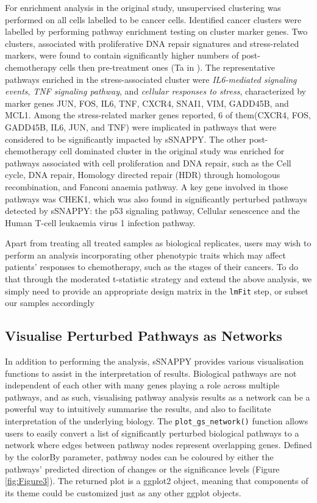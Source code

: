 \documentclass[9pt,a4paper,]{extarticle}
\begin{document}
For enrichment analysis in the original study\citep{Zhang2022}, unsupervised clustering was performed on all cells labelled to be cancer cells.
Identified cancer clusters were labelled by performing pathway enrichment testing on cluster marker genes.
Two clusters, associated with proliferative DNA repair signatures and stress-related markers, were found to contain significantly higher numbers of post-chemotherapy cells then pre-treatment ones (Ta in \citep{Zhang2022}).
The representative pathways enriched in the stress-associated cluster were \emph{IL6-mediated signaling events}, \emph{TNF signaling pathway}, and \emph{cellular responses to stress}, characterized by marker genes JUN, FOS, IL6, TNF, CXCR4, SNAI1, VIM, GADD45B, and MCL1.
Among the stress-related marker genes reported, 6 of them(CXCR4, FOS, GADD45B, IL6, JUN, and TNF) were implicated in pathways that were considered to be significantly impacted by sSNAPPY.
The other post-chemotherapy cell dominated cluster in the original study was enriched for pathways associated with cell proliferation and DNA repair, such as the Cell cycle, DNA repair, Homology directed repair (HDR) through homologous recombination, and Fanconi anaemia pathway.
A key gene involved in those pathways was CHEK1, which was also found in significantly perturbed pathways detected by sSNAPPY: the p53 signaling pathway, Cellular senescence and the Human T-cell leukaemia virus 1 infection pathway.

Apart from treating all treated samples as biological replicates, users may wish to perform an analysis incorporating other phenotypic traits which may affect patients' responses to chemotherapy, such as the stages of their cancers.
To do that through the moderated t-statistic strategy and extend the above analysis, we simply need to provide an appropriate design matrix in the \texttt{lmFit} step, or subset our samples accordingly

\hypertarget{visualise-perturbed-pathways-as-networks}{%
\subsection{Visualise Perturbed Pathways as Networks}\label{visualise-perturbed-pathways-as-networks}}

In addition to performing the analysis, sSNAPPY provides various visualisation functions to assist in the interpretation of results.
Biological pathways are not independent of each other with many genes playing a role across multiple pathways, and as such, visualising pathway analysis results as a network can be a powerful way to intuitively summarise the results, and also to facilitate interpretation of the underlying biology.
The \texttt{plot\_gs\_network()} function allows users to easily convert a list of significantly perturbed biological pathways to a network where edges between pathway nodes represent overlapping genes.
Defined by the colorBy parameter, pathway nodes can be coloured by either the pathways' predicted direction of changes or the significance levels (Figure \ref{fig:Figure3}).
The returned plot is a ggplot2 \citep{Wickham2009} object, meaning that components of its theme could be customized just as any other ggplot objects.
\end{document}
